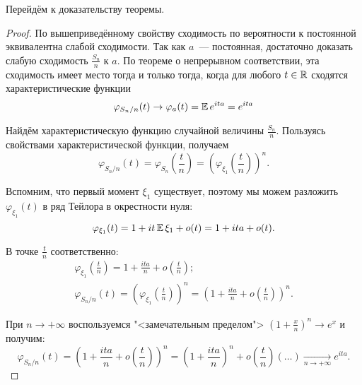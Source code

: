 Перейдём к доказательству теоремы.

\begin{proof}
    По вышеприведённому свойству сходимость по вероятности к постоянной эквивалентна слабой сходимости. 
    Так как $a$~--- постоянная, достаточно доказать слабую сходимость $\frac{S_{n}}{n}$ к $a$. 
    По теореме о непрерывном соответствии, эта сходимость имеет место тогда и только тогда, когда для любого $t \in \mathbb{R}$ сходятся характеристические функции
    \begin{equation*}
        \varphi_{S_{n} / n}(t) \to \varphi_{a}(t) =
        \operatorname{\mathbb{E}} e^{i t a}=e^{i t a}
    \end{equation*}
    
    Найдём характеристическую функцию случайной величины $\frac{S_{n}}{n}$. 
    Пользуясь свойствами характеристической функции, получаем
    \begin{equation*}
        \varphi_{S_{n} / n}(t) = 
        \varphi_{S_{n}}\left(\frac{t}{n}\right) =
        \left(\varphi_{\xi_{1}}\left(\frac{t}{n}\right)\right)^{n}.
    \end{equation*}
    
    Вспомним, что первый момент $\xi_{1}$ существует, поэтому мы можем разложить $\varphi_{\xi_{1}}(t)$ в ряд Тейлора в окрестности нуля:
    \begin{equation*}
        \varphi_{\xi_{1}}(t) = 1 + it\operatorname{\mathbb{E}} \xi_{1} + o(t)=1 + ita + o(t).
    \end{equation*}
    
    В точке $\frac{t}{n}$ соответственно:
    \begin{gather*}
        \varphi_{\xi_{1}}\left(\frac{t}{n}\right) = 
        1+\frac{i t a}{n}+o\left(\frac{t}{n}\right); \\
        \varphi_{S_{n} / n}(t)=\left(\varphi_{\xi_{1}}\left(\frac{t}{n}\right)\right)^{n} = 
        \left(1+\frac{i t a}{n}+o\left(\frac{t}{n}\right)\right)^{n}.
    \end{gather*}
    
    При $n \to +\infty$ воспользуемся "<замечательным пределом"> $\left(1+\frac{x}{n}\right)^{n} \to e^{x}$ и получим:
    \begin{equation*}
        \varphi_{S_{n} / n}(t) = 
        \left(1 + \frac{ita}{n} + o\left(\frac{t}{n}\right)\right)^{n} =
        \left(1 + \frac{ita}{n}\right)^n + o\left(\frac{t}{n}\right)(\ldots)
        \xrightarrow[n \to +\infty]{} e^{i t a}.
    \end{equation*}
\end{proof}
